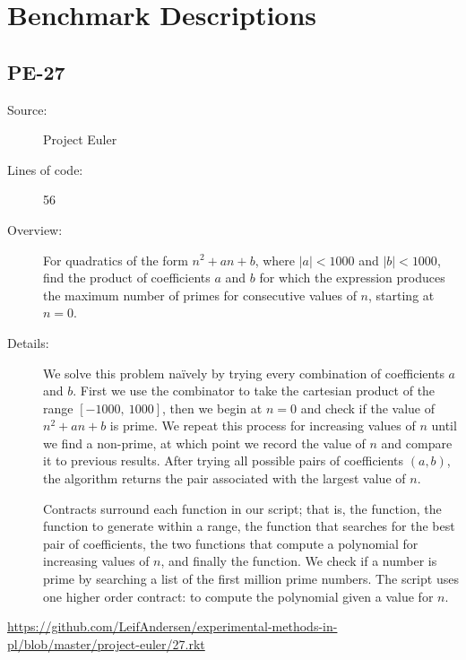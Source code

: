 \section{Benchmark Descriptions}

\subsection*{PE-27~\hrulefill}
\begin{description}
\item[Source:] Project Euler
\item[Lines of code:] 56
\item[Overview:] For quadratics of the form $n^2 + an + b$, where $|a| < 1000$ and $|b| < 1000$, find the product of coefficients $a$ and $b$ for which the expression produces the maximum number of primes for consecutive values of $n$, starting at $n=0$.
\item[Details:] 
  We solve this problem na\"ively by trying every combination of coefficients $a$ and $b$.
  First we use the  combinator to take the cartesian product of the range $[-1000,~1000]$, then we begin at $n=0$ and check if the value of $n^2 + an + b$ is prime.
  We repeat this process for increasing values of $n$ until we find a non-prime, at which point we record the value of $n$ and compare it to previous results.
  After trying all possible pairs of coefficients $(a,b)$, the algorithm returns the pair associated with the largest value of $n$.

  Contracts surround each function in our script; that is, the  function, the function to generate  within a range, the function  that searches for the best pair of coefficients, the two functions that compute a polynomial for increasing values of $n$, and finally the  function.
  We check if a number is prime by searching a list of the first million prime numbers.
  The script uses one higher order contract: to compute the polynomial given a value for $n$.
\end{description}
\url{https://github.com/LeifAndersen/experimental-methods-in-pl/blob/master/project-euler/27.rkt}

